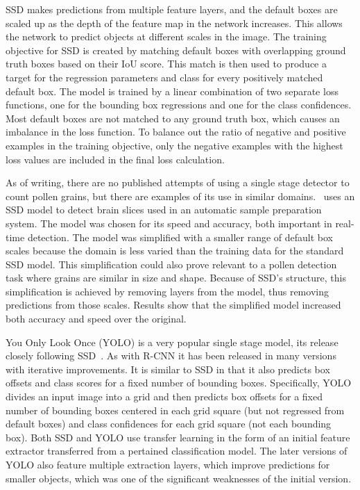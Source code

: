 SSD makes predictions from multiple feature layers, and the default boxes are scaled up as the depth of the feature map in the network increases.
This allows the network to predict objects at different scales in the image.
The training objective for SSD is created by matching default boxes with overlapping ground truth boxes based on their IoU score.
This match is then used to produce a target for the regression parameters and class for every positively matched default box.
The model is trained by a linear combination of two separate loss functions, one for the bounding box regressions and one for the class confidences.
Most default boxes are not matched to any ground truth box, which causes an imbalance in the loss function.
To balance out the ratio of negative and positive examples in the training objective, only the negative examples with the highest loss values are included in the final loss calculation.

As of writing, there are no published attempts of using a single stage detector to count pollen grains, but there are examples of its use in similar domains.\ \cite{liu_brain_2018} uses an SSD model to detect brain slices used in an automatic sample preparation system.
The model was chosen for its speed and accuracy, both important in real-time detection.
The model was simplified with a smaller range of default box scales because the domain is less varied than the training data for the standard SSD model.
This simplification could also prove relevant to a pollen detection task where grains are similar in size and shape.
Because of SSD's structure, this simplification is achieved by removing layers from the model, thus removing predictions from those scales.
Results show that the simplified model increased both accuracy and speed over the original.

You Only Look Once (YOLO) is a very popular single stage model, its release closely following SSD\ \parencite{redmon2016look}.
As with R-CNN it has been released in many versions with iterative improvements.
It is similar to SSD in that it also predicts box offsets and class scores for a fixed number of bounding boxes.
Specifically, YOLO divides an input image into a grid and then predicts box offsets for a fixed number of bounding boxes centered in each grid square (but not regressed from default boxes) and class confidences for each grid square (not each bounding box).
Both SSD and YOLO use transfer learning in the form of an initial feature extractor transferred from a pertained classification model.
The later versions of YOLO also feature multiple extraction layers, which improve predictions for smaller objects, which was one of the significant weaknesses of the initial version.

